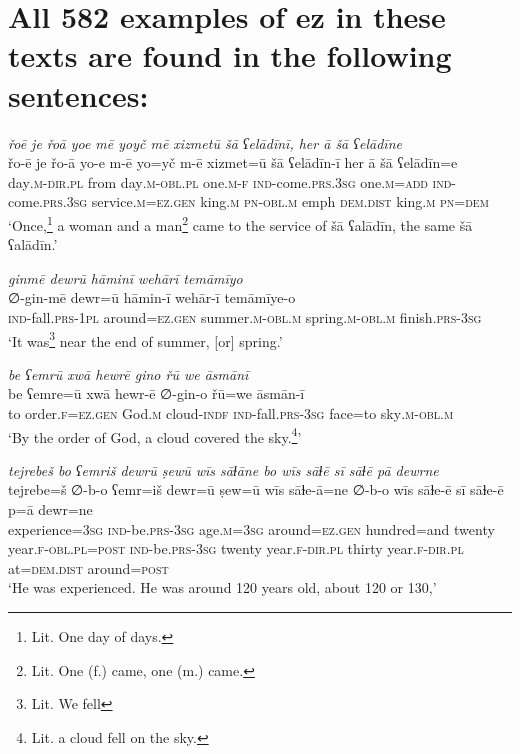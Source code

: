 \chapter{All 582 examples of ez in these texts are found in the following sentences:}

\ea \label{ZB.1}
\textit{řoē je řoā yoe mē yoyč mē xizmetū šā ʕelādīnī, her ā šā ʕelādīne} \\ 
\gll řo-ē je řo-ā yo-e m-ē yo=yč m-ē xizmet=ū šā ʕelādīn-ī her ā šā ʕelādīn=e \\ 
 day\textsc{.m}\textsc{-dir}\textsc{.pl} from day\textsc{.m}\textsc{-obl}\textsc{.pl} one\textsc{.m}\textsc{-f} \textsc{ind-}come\textsc{.prs}\textsc{.3sg} one\textsc{.m}\textsc{=add} \textsc{ind-}come\textsc{.prs}\textsc{.3sg} service\textsc{.m}\textsc{\textsc{=ez.gen}} king\textsc{.m} \textsc{pn}\textsc{-obl}\textsc{.m} emph \textsc{dem.dist} king\textsc{.m} \textsc{pn}\textsc{=dem} \\ 
\glt `Once,\footnote{Lit. One day of days.} a woman and a man\footnote{Lit. One (f.) came, one (m.) came.} came to the service of šā ʕalādīn, the same šā ʕalādīn.'
\z 
 
\ea \label{ZB.7}
\textit{ginmē dewrū hāminī wehārī temāmīyo} \\ 
\gll ∅-gin-mē dewr=ū hāmin-ī wehār-ī temāmīye-o \\ 
 \textsc{ind-}fall\textsc{.prs}\textsc{-1pl} around\textsc{\textsc{=ez.gen}} summer\textsc{.m}\textsc{-obl}\textsc{.m} spring\textsc{.m}\textsc{-obl}\textsc{.m} finish\textsc{.prs}\textsc{-3sg} \\ 
\glt `It was\footnote{Lit. We fell} near the end of summer, [or] spring.'
\z 
 
\ea \label{ZB.11}
\textit{be ʕemrū xwā hewrē gino řū we āsmānī} \\ 
\gll be ʕemre=ū xwā hewr-ē ∅-gin-o řū=we āsmān-ī \\ 
 to order\textsc{.f}\textsc{\textsc{=ez.gen}} God\textsc{.m} cloud\textsc{-indf} \textsc{ind-}fall\textsc{.prs}\textsc{-3sg} face=to sky\textsc{.m}\textsc{-obl}\textsc{.m} \\ 
\glt `By the order of God, a cloud covered the sky.\footnote{Lit. a cloud fell on the sky.}'
\z 
 
\ea \label{ZB.12}
\textit{tejrebeš bo ʕemriš dewrū ṣewū wīs sāɫāne bo wīs sāɫē sī sāɫē pā dewrne} \\ 
\gll tejrebe=š ∅-b-o ʕemr=iš dewr=ū ṣew=ū wīs sāɫe-ā=ne ∅-b-o wīs sāɫe-ē sī sāɫe-ē p=ā dewr=ne \\ 
 experience\textsc{=3sg} \textsc{ind-}be\textsc{.prs}\textsc{-3sg} age\textsc{.m}\textsc{=3sg} around\textsc{\textsc{=ez.gen}} hundred=and twenty year\textsc{.f}\textsc{-obl}\textsc{.pl}\textsc{=\textsc{post}} \textsc{ind-}be\textsc{.prs}\textsc{-3sg} twenty year\textsc{.f}\textsc{-dir}\textsc{.pl} thirty year\textsc{.f}\textsc{-dir}\textsc{.pl} at=\textsc{dem.dist} around\textsc{=\textsc{post}} \\ 
\glt `He was experienced. He was around 120 years old, about 120 or 130,'
\z 
 
